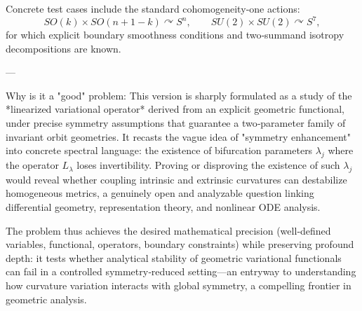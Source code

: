 Concrete test cases include the standard cohomogeneity‑one actions:
\[
SO(k)\times SO(n{+}1{-}k)\!\curvearrowright\! S^n,\qquad SU(2)\times SU(2)\!\curvearrowright\! S^7,
\]
for which explicit boundary smoothness conditions and two‑summand isotropy decompositions are known.

---

Why is it a "good" problem:  
This version is sharply formulated as a study of the *linearized variational operator* derived from an explicit geometric functional, under precise symmetry assumptions that guarantee a two‑parameter family of invariant orbit geometries.  
It recasts the vague idea of "symmetry enhancement" into concrete spectral language: the existence of bifurcation parameters \(\lambda_j\) where the operator \(L_\lambda\) loses invertibility.  
Proving or disproving the existence of such \(\lambda_j\) would reveal whether coupling intrinsic and extrinsic curvatures can destabilize homogeneous metrics, a genuinely open and analyzable question linking differential geometry, representation theory, and nonlinear ODE analysis.  

The problem thus achieves the desired mathematical precision (well‑defined variables, functional, operators, boundary constraints) while preserving profound depth: it tests whether analytical stability of geometric variational functionals can fail in a controlled symmetry‑reduced setting—an entryway to understanding how curvature variation interacts with global symmetry, a compelling frontier in geometric analysis.